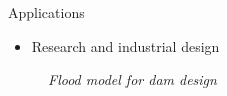 \documentclass{beamer}
\begin{document}
\begin{frame}{Applications}
  \begin{itemize}
    \item Research and industrial design
  \end{itemize}
  
  \begin{figure}[thpb]
    \centering
    \caption*{\emph{Flood model for dam design}}
  \label{fig:3}
  \end{figure}
\end{frame}
\end{document}
